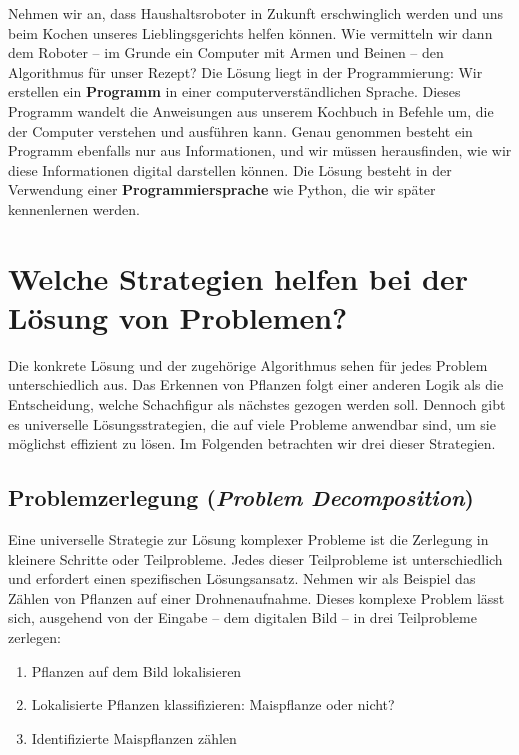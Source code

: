 \documentclass[
  ngerman,
  letterpaper,
  DIV=11]{scrreprt}
\providecommand{\tightlist}{%
  \setlength{\itemsep}{0pt}\setlength{\parskip}{0pt}}
\begin{document}
Nehmen wir an, dass Haushaltsroboter in Zukunft erschwinglich werden und
uns beim Kochen unseres Lieblingsgerichts helfen können. Wie vermitteln
wir dann dem Roboter -- im Grunde ein Computer mit Armen und Beinen --
den Algorithmus für unser Rezept? Die Lösung liegt in der
Programmierung: Wir erstellen ein \textbf{Programm} in einer
computerverständlichen Sprache. Dieses Programm wandelt die Anweisungen
aus unserem Kochbuch in Befehle um, die der Computer verstehen und
ausführen kann. Genau genommen besteht ein Programm ebenfalls nur aus
Informationen, und wir müssen herausfinden, wie wir diese Informationen
digital darstellen können. Die Lösung besteht in der Verwendung einer
\textbf{Programmiersprache} wie Python, die wir später kennenlernen
werden.

\section{Welche Strategien helfen bei der Lösung von
Problemen?}\label{welche-strategien-helfen-bei-der-luxf6sung-von-problemen}

Die konkrete Lösung und der zugehörige Algorithmus sehen für jedes
Problem unterschiedlich aus. Das Erkennen von Pflanzen folgt einer
anderen Logik als die Entscheidung, welche Schachfigur als nächstes
gezogen werden soll. Dennoch gibt es universelle Lösungsstrategien, die
auf viele Probleme anwendbar sind, um sie möglichst effizient zu lösen.
Im Folgenden betrachten wir drei dieser Strategien.

\subsection{\texorpdfstring{Problemzerlegung (\emph{Problem
Decomposition})}{Problemzerlegung (Problem Decomposition)}}\label{problemzerlegung-problem-decomposition}

Eine universelle Strategie zur Lösung komplexer Probleme ist die
Zerlegung in kleinere Schritte oder Teilprobleme. Jedes dieser
Teilprobleme ist unterschiedlich und erfordert einen spezifischen
Lösungsansatz. Nehmen wir als Beispiel das Zählen von Pflanzen auf einer
Drohnenaufnahme. Dieses komplexe Problem lässt sich, ausgehend von der
Eingabe -- dem digitalen Bild -- in drei Teilprobleme zerlegen:

\begin{enumerate}
\def\labelenumi{\arabic{enumi}.}
\tightlist
\item
  Pflanzen auf dem Bild lokalisieren
\item
  Lokalisierte Pflanzen klassifizieren: Maispflanze oder nicht?
\item
  Identifizierte Maispflanzen zählen
\end{enumerate}
\end{document}
